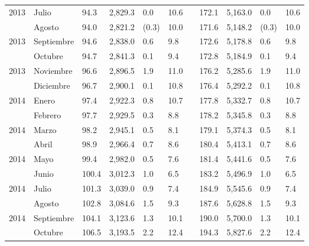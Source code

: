 \begin{center}
\begin{longtable}{llp{1.1cm}p{1.2cm}p{1.2cm}p{1.2cm}rp{1.2cm}p{1.2cm}p{1.2cm}p{1.2cm}}
		\multicolumn{1}{l}{	2013	}&	Julio	&	 94.3 	&	 2,829.3 	&	 0.0 	&	 10.6 	&  &	 172.1 	&	 5,163.0 	&	 0.0 	&	 10.6 	\\
		\rowcolor{color1!5!white}\multicolumn{1}{l}{	2013	}&	Agosto	&	 94.0 	&	 2,821.2 	&	 (0.3)	&	 10.0 	&  &	 171.6 	&	 5,148.2 	&	 (0.3)	&	 10.0 	\\
		\multicolumn{1}{l}{	2013	}&	Septiembre	&	 94.6 	&	 2,838.0 	&	 0.6 	&	 9.8 	&  &	 172.6 	&	 5,178.8 	&	 0.6 	&	 9.8 	\\
		\rowcolor{color1!5!white}\multicolumn{1}{l}{	2013	}&	Octubre	&	 94.7 	&	 2,841.3 	&	 0.1 	&	 9.4 	&  &	 172.8 	&	 5,184.9 	&	 0.1 	&	 9.4 	\\
		\multicolumn{1}{l}{	2013	}&	Noviembre	&	 96.6 	&	 2,896.5 	&	 1.9 	&	 11.0 	&  &	 176.2 	&	 5,285.6 	&	 1.9 	&	 11.0 	\\
		\rowcolor{color1!5!white}\multicolumn{1}{l}{	2013	}&	Diciembre	&	 96.7 	&	 2,900.1 	&	 0.1 	&	 10.8 	&  &	 176.4 	&	 5,292.2 	&	 0.1 	&	 10.8 	\\
		\multicolumn{1}{l}{	2014	}&	Enero	&	 97.4 	&	 2,922.3 	&	 0.8 	&	 10.7 	&  &	 177.8 	&	 5,332.7 	&	 0.8 	&	 10.7 	\\
		\rowcolor{color1!5!white}\multicolumn{1}{l}{	2014	}&	Febrero	&	 97.7 	&	 2,929.5 	&	 0.3 	&	 8.8 	&  &	 178.2 	&	 5,345.8 	&	 0.3 	&	 8.8 	\\
		\multicolumn{1}{l}{	2014	}&	Marzo	&	 98.2 	&	 2,945.1 	&	 0.5 	&	 8.1 	&  &	 179.1 	&	 5,374.3 	&	 0.5 	&	 8.1 	\\
		\rowcolor{color1!5!white}\multicolumn{1}{l}{	2014	}&	Abril	&	 98.9 	&	 2,966.4 	&	 0.7 	&	 8.6 	&  &	 180.4 	&	 5,413.1 	&	 0.7 	&	 8.6 	\\
		\multicolumn{1}{l}{	2014	}&	Mayo	&	 99.4 	&	 2,982.0 	&	 0.5 	&	 7.6 	&  &	 181.4 	&	 5,441.6 	&	 0.5 	&	 7.6 	\\
		\rowcolor{color1!5!white}\multicolumn{1}{l}{	2014	}&	Junio	&	 100.4 	&	 3,012.3 	&	 1.0 	&	 6.5 	&  &	 183.2 	&	 5,496.9 	&	 1.0 	&	 6.5 	\\
		\multicolumn{1}{l}{	2014	}&	Julio	&	 101.3 	&	 3,039.0 	&	 0.9 	&	 7.4 	&  &	 184.9 	&	 5,545.6 	&	 0.9 	&	 7.4 	\\
		\rowcolor{color1!5!white}\multicolumn{1}{l}{	2014	}&	Agosto	&	 102.8 	&	 3,084.6 	&	 1.5 	&	 9.3 	&  &	 187.6 	&	 5,628.8 	&	 1.5 	&	 9.3 	\\
		\multicolumn{1}{l}{	2014	}&	Septiembre	&	 104.1 	&	 3,123.6 	&	 1.3 	&	 10.1 	&  &	 190.0 	&	 5,700.0 	&	 1.3 	&	 10.1 	\\
		\rowcolor{color1!5!white}\multicolumn{1}{l}{	2014	}&	Octubre	&	 106.5 	&	 3,193.5 	&	 2.2 	&	 12.4 	&  &	 194.3 	&	 5,827.6 	&	 2.2 	&	 12.4 	\\

\end{longtable}
\end{center}
